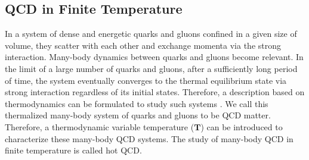 \subsection{QCD in Finite Temperature} 


In a system of dense and energetic quarks and gluons confined in a given size of volume, they scatter with each other and exchange momenta via the strong interaction. Many-body dynamics between quarks and gluons become relevant. In the limit of a large number of quarks and gluons, after a sufficiently long period of time, the system eventually converges to the thermal equilibrium state via strong interaction \cite{MLBThermal,ADSCFTThermal,QCDThermal} regardless of its initial states. Therefore, a description based on thermodynamics can be formulated to study such systems \cite{QCDThemDyn}. We call this thermalized many-body system of quarks and gluons to be QCD matter. Therefore, a thermodynamic variable temperature ($\mathbf{T}$) can be introduced to characterize these many-body QCD systems. The study of many-body QCD in finite temperature is called hot QCD. 



